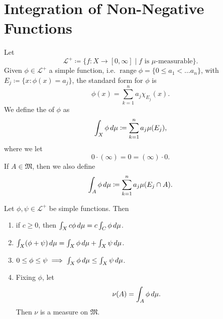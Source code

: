 \documentclass[notoc,notitlepage]{tufte-book}
\DeclareMathOperator{\range}{range}
\begin{document}

\section{Integration of Non-Negative Functions}%
\label{sec:integration_of_non_negative_functions}

\begin{defn}\label{defn:integral_of_a_simple_function}
  Let
  \begin{equation*}
    \mathcal{L}^+ \coloneqq \{ f : X \to [0, \infty]
          \mid f \text{ is } \mu\text{-measurable} \}.
  \end{equation*}
  Given $\phi \in \mathcal{L}^+$ a simple function,
  i.e. $\range \phi = \{ 0 \leq a_1 < \hdots a_n \}$,
  with $E_j \coloneqq \{ x : \phi(x) = a_j \}$,
  the standard form for $\phi$ is
  \begin{equation*}
    \phi(x) = \sum_{k=1}^{n} a_j \chi_{E_j}(x).
  \end{equation*}
  We define the  of $\phi$ as
  \begin{equation*}
    \int_{X} \phi \mathop{}\!d{\mu} \coloneqq \sum_{k=1}^{n} a_j \mu(E_j),
  \end{equation*}
  where we let
  \begin{equation*}
    0 \cdot ( \infty ) = 0 = ( \infty ) \cdot 0.
  \end{equation*}
  If $A \in \mathfrak{M}$, then we also define
  \begin{equation*}
    \int_{A} \phi \mathop{}\!d{\mu} \coloneqq \sum_{k=1}^{n} a_j \mu(E_j \cap A).
  \end{equation*}
\end{defn}

\begin{propo}\label{propo:properties_of_integrals_of_simple_functions}
  Let $\phi, \psi \in \mathcal{L}^+$ be simple functions. Then
  \begin{enumerate}
    \item if $c \geq 0$,
      then $\int_{X} c \phi \mathop{}\!d{\mu} = c \int_{C} \phi \mathop{}\!d{\mu}$.
    \item $\int_{X} (\phi + \psi) \mathop{}\!d{\mu}
      = \int_{X} \phi \mathop{}\!d{\mu} + \int_{X} \psi \mathop{}\!d{\mu}$.
    \item $0 \leq \phi \leq \psi \implies
      \int_{X} \phi \mathop{}\!d{\mu} \leq \int_{X} \psi \mathop{}\!d{\mu}$.
    \item Fixing $\phi$, let
      \begin{equation*}
        \nu(A) = \int_{A} \phi \mathop{}\!d{\mu}.
      \end{equation*}
      Then $\nu$ is a measure on $\mathfrak{M}$.
  \end{enumerate}
\end{propo}
\end{document}
